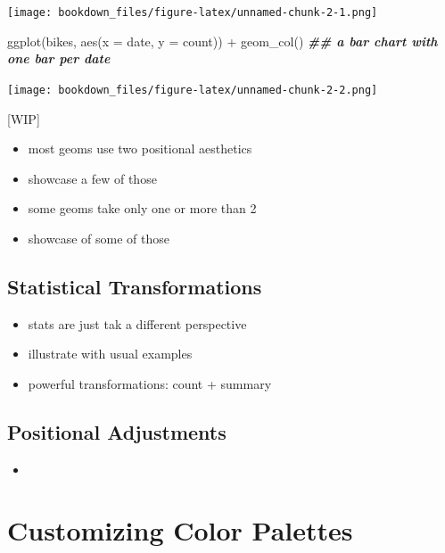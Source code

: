 \documentclass[
]{krantz}
\makeatletter
\newenvironment{Shaded}{\begin{snugshade}}{\end{snugshade}}
\newcommand{\AttributeTok}[1]{\textcolor[rgb]{0.61,0.61,0.61}{#1}}
\newcommand{\DocumentationTok}[1]{\textcolor[rgb]{0.37,0.37,0.37}{\textbf{\textit{#1}}}}
\newcommand{\FunctionTok}[1]{\textcolor[rgb]{0,0,0}{#1}}
\newcommand{\NormalTok}[1]{#1}
\newcommand{\SpecialCharTok}[1]{\textcolor[rgb]{0,0,0}{#1}}
\providecommand{\tightlist}{%
  \setlength{\itemsep}{0pt}\setlength{\parskip}{0pt}}
\newenvironment{kframe}{%
\medskip{}
\setlength{\fboxsep}{.8em}
 \def\at@end@of@kframe{}%
 \ifinner\ifhmode%
  \def\at@end@of@kframe{\end{minipage}}%
  \begin{minipage}{\columnwidth}%
 \fi\fi%
 \def\FrameCommand##1{\hskip\@totalleftmargin \hskip-\fboxsep
 \colorbox{shadecolor}{##1}\hskip-\fboxsep
     \hskip-\linewidth \hskip-\@totalleftmargin \hskip\columnwidth}%
 \MakeFramed {\advance\hsize-\width
   \@totalleftmargin\z@ \linewidth\hsize
   \@setminipage}}%
 {\par\unskip\endMakeFramed%
 \at@end@of@kframe}
\renewenvironment{Shaded}{\begin{kframe}}{\end{kframe}}
\makeatother
\begin{document}
\texttt{[image: bookdown\_files/figure-latex/unnamed-chunk-2-1.png]}

\begin{Shaded}
\begin{Highlighting}[]
\FunctionTok{ggplot}\NormalTok{(bikes, }\FunctionTok{aes}\NormalTok{(}\AttributeTok{x =}\NormalTok{ date, }\AttributeTok{y =}\NormalTok{ count)) }\SpecialCharTok{+}
  \FunctionTok{geom\_col}\NormalTok{() }\DocumentationTok{\#\# a bar chart with one bar per date}
\end{Highlighting}
\end{Shaded}

\texttt{[image: bookdown\_files/figure-latex/unnamed-chunk-2-2.png]}

{[}WIP{]}

\begin{itemize}
\tightlist
\item
  most geoms use two positional aesthetics
\item
  showcase a few of those
\item
  some geoms take only one or more than 2
\item
  showcase of some of those
\end{itemize}

\hypertarget{statistical-transformations}{%
\section{Statistical Transformations}\label{statistical-transformations}}

\begin{itemize}
\tightlist
\item
  stats are just tak a different perspective
\item
  illustrate with usual examples
\item
  powerful transformations: count + summary
\end{itemize}

\hypertarget{positional-adjustments}{%
\section{Positional Adjustments}\label{positional-adjustments}}

\begin{itemize}
\tightlist
\item
\end{itemize}

\hypertarget{customizing-color-palettes}{%
\chapter{Customizing Color Palettes}\label{customizing-color-palettes}}
\end{document}
